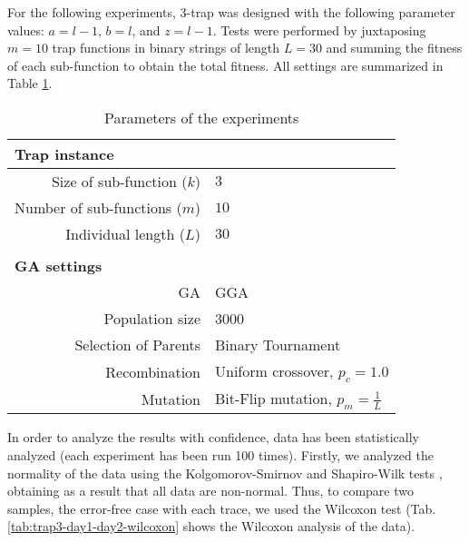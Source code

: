 \documentclass[graybox]{sty/svmult}
\begin{document}
For the following experiments, 3-trap was designed with the following parameter values: $a = l-1$, $b = l$, and $z = l-1$. Tests were performed by juxtaposing $m=10$ trap functions in binary strings of length $L=30$ and summing the fitness of each sub-function to obtain the total fitness. 
All settings are summarized in Table \ref{table:parameters}. 

\begin{table}[htbp]
\centering
\caption{Parameters of the experiments\label{table:parameters}}
{\footnotesize
\begin{tabular}{r l}
\multicolumn{2}{l}{\textbf{Trap instance}}\\
\hline
Size of sub-function ($k$) & $3$\\
Number of sub-functions ($m$) & $10$\\
Individual length ($L$) & $30$\\
&\\
\multicolumn{2}{l}{\textbf{GA settings}}\\
\hline
GA & GGA \\
Population size & 3000\\
Selection of Parents & Binary Tournament\\
Recombination & Uniform crossover, $p_c = 1.0$ \\
Mutation & Bit-Flip mutation, $p_m = \frac{1}{L}$\\
%
\end{tabular}
}
\end{table}

In order to analyze the results with confidence, data has been statistically analyzed 
(each experiment has been run 100
times). Firstly, we analyzed the normality of the data using the Kolgomorov-Smirnov and Shapiro-Wilk tests \cite{statistics-r},
obtaining as a result that all data are non-normal. Thus, to compare two samples, the error-free case with each trace, we used the Wilcoxon test
(Tab. \ref{tab:trap3-day1-day2-wilcoxon} shows the Wilcoxon analysis of the data). 
\end{document}
